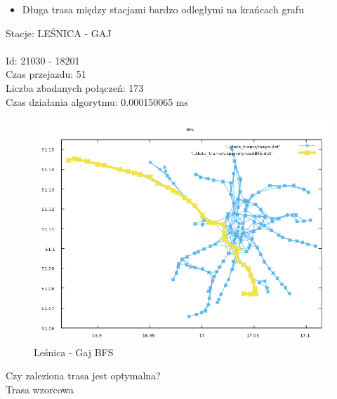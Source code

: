\documentclass[13pt]{article}
\begin{document}
\newpage
\begin{itemize}
\item Długa trasa między stacjami bardzo odległymi na krańcach grafu
\end{itemize}
\hspace{1.5cm} Stacje: LEŚNICA - GAJ \\\\
Id: 21030   - 18201\\
Czas przejazdu: 51\\
Liczba zbadanych połączeń: 173\\
Czas działania algorytmu: 0.000150065 ms
\begin{figure}[hp]
\centering
\includegraphics[width=1\textwidth]{wykresy/LES_GAJ_BFS.png}
\caption{Leśnica - Gaj BFS}
\end{figure}

Czy zaleziona trasa jest optymalna?\\
Trasa wzorcowa
\end{document}

